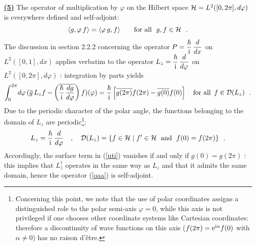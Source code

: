 \documentclass[a4wide,12pt]{report}
\begin{document}
\underline{{\bf (5)}}
The operator of multiplication by $\varphi$ on the Hilbert space 
${\cal H} = L^2
([0,2 \pi ], d\varphi )$ 
is everywhere defined and self-adjoint: 
\[
\langle g , \varphi \, f \rangle
 = \langle  \varphi \, g , f \rangle \qquad \mbox{for all} \ \
g,f \in {\cal H}
\ \ .
\]
The discussion in section 2.2.2
concerning the operator $P = \displaystyle{\hbar \over {\rm i}} \,
\displaystyle{d \over dx}$ on 
$L^2
([0,1], dx )$ applies verbatim  to the operator 
$L_z = \displaystyle{\hbar \over {\rm i}} \,
\displaystyle{d \over d\varphi}$ on 
$L^2
([0,2 \pi ], d\varphi )$ : integration by parts yields
\begin{equation}
\label{uti}
\int_0^{2\pi} \! d \varphi \, (  \overline{g} \, L_z f
-
\left( \overline{\displaystyle{\hbar \over {\rm i}} \,
\displaystyle{dg \over d\varphi} }  \right)  f ) (\varphi )
= \displaystyle{\hbar \over {\rm i}} \left[ \overline{g(2 \pi)} f (2 \pi) -
\overline{g( 0)} f (0) \right]
\quad \mbox{for all} \ \, f \in {\cal D}(L_z)
\ \ .
\end{equation}
Due to the periodic character of the polar angle, 
the functions belonging to the domain of $L_z$
are periodic\footnote{Concerning this point, we note that 
the use of polar coordinates assigns a distinguished role to 
the polar semi-axis $\varphi =0$, while this axis is not privileged 
if one chooses other coordinate systems like Cartesian 
coordinates: 
therefore a discontinuity of wave functions on this axis 
($f(2 \pi)= {\rm e}^{{\rm i} \alpha}
f(0)$ with 
$\alpha \neq 0$)
has no raison d'\^etre.}:
\begin{equation}
\label{oaa}
L_z = \displaystyle{\hbar \over {\rm i}} \, \displaystyle{d \over d\varphi} \quad , \quad
{\cal D} (L_z ) = \{ f \in {\cal H} \; | \;
f^{\prime} \in {\cal H} \ \; {\rm and} \ \; f(0) = f(2 \pi ) \}
\ \ .
\end{equation}
Accordingly, the surface term in (\ref{uti}) vanishes
if and only if $g(0) = g(2 \pi)$ :
this implies that $L_z^{\dag}$ operates in the same way as $L_z$
and that it admits the same domain, hence 
the operator (\ref{oaa}) is self-adjoint. 
\end{document}

